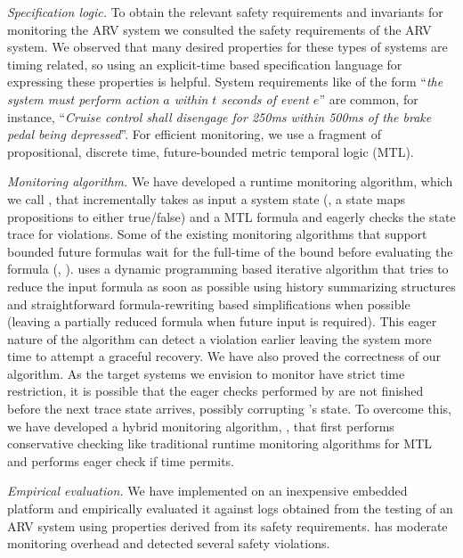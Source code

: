 \noindent
\textit{Specification logic.}
To obtain the relevant safety requirements and invariants for monitoring the ARV system we consulted the safety requirements of the ARV system.
We observed that many desired properties for these types of systems are timing related, so using an explicit-time based specification language for expressing these properties is helpful.
System requirements like
 of the form ``\emph{the system must perform action $a$ within $t$ seconds of event $e$}'' are common,
 for instance,
``\emph{Cruise control shall disengage for 250ms within 500ms of the brake pedal being depressed}''.
%
For efficient monitoring, we use a fragment of propositional, discrete time, future-bounded metric temporal logic (MTL)\cite{Koymans1990}.

\noindent
\textit{Monitoring algorithm.}
We have developed a runtime monitoring algorithm, which we call \monitor, that incrementally takes as input a system state
(\ie, a state maps  propositions to either true/false) and a MTL formula and eagerly checks the state trace for violations.
Some of the existing monitoring algorithms that support bounded future formulas wait for the full-time of the bound before evaluating the formula (\eg, \cite{Basin2008}).
\monitor uses a dynamic programming based iterative algorithm that tries to reduce the input formula as soon as possible using history summarizing structures and straightforward formula-rewriting based simplifications when possible (leaving a partially reduced formula when future input is required).
This eager nature of the algorithm can detect a violation earlier leaving the system more time to attempt a graceful recovery.
We have also proved the correctness of our algorithm. As the target systems we envision to monitor
have strict time restriction,
it is possible that the eager checks
performed by \monitor are not finished before the next trace state arrives,
possibly corrupting \monitor's state. To overcome this,
we have developed a hybrid monitoring algorithm, \ha, that first performs conservative
checking like traditional runtime monitoring algorithms for MTL and performs eager check
if time permits.

\noindent
\textit{Empirical evaluation.}
We have implemented \monitor on an inexpensive embedded platform and empirically evaluated it against logs obtained from the testing of an ARV system using properties derived from its safety requirements.
\monitor has moderate monitoring overhead and detected several safety violations.


